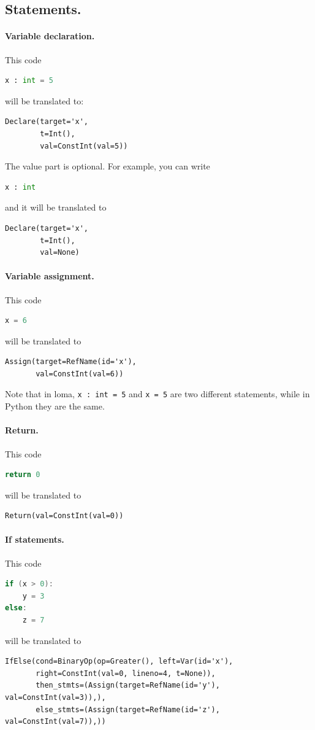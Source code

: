 \subsection{Statements.} 

\paragraph{Variable declaration.} This code
\begin{lstlisting}[language=Python]
x : int = 5
\end{lstlisting}
will be translated to:
\begin{lstlisting}
Declare(target='x',
        t=Int(),
        val=ConstInt(val=5))
\end{lstlisting}

The value part is optional. For example, you can write
\begin{lstlisting}[language=Python]
x : int
\end{lstlisting}
and it will be translated to
\begin{lstlisting}
Declare(target='x',
        t=Int(),
        val=None)
\end{lstlisting}

\paragraph{Variable assignment.} This code
\begin{lstlisting}[language=Python]
x = 6
\end{lstlisting}
will be translated to
\begin{lstlisting}
Assign(target=RefName(id='x'),
       val=ConstInt(val=6))
\end{lstlisting}

Note that in loma, \lstinline{x : int = 5} and \lstinline{x = 5} are two different statements, while in Python they are the same.

\paragraph{Return.} This code
\begin{lstlisting}[language=Python]
return 0
\end{lstlisting}
will be translated to
\begin{lstlisting}
Return(val=ConstInt(val=0))
\end{lstlisting}

\paragraph{If statements.} This code
\begin{lstlisting}[language=c]
if (x > 0):
    y = 3
else:
    z = 7
\end{lstlisting}
will be translated to
\begin{lstlisting}
IfElse(cond=BinaryOp(op=Greater(), left=Var(id='x'),
       right=ConstInt(val=0, lineno=4, t=None)),
       then_stmts=(Assign(target=RefName(id='y'), val=ConstInt(val=3)),),
       else_stmts=(Assign(target=RefName(id='z'), val=ConstInt(val=7)),))
\end{lstlisting}

